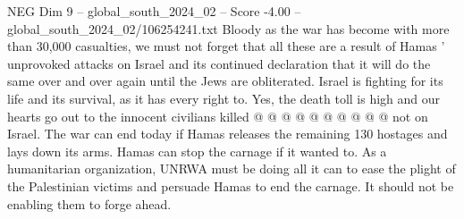 \begin{textsample}{NEG Dim 9 – global\_south\_2024\_02 – Score -4.00 – global\_south\_2024\_02/106254241.txt}
Bloody as the war has become with more than 30,000 casualties, we must not forget that all these are a result of Hamas ' unprovoked attacks on Israel and its continued declaration that it will do the same over and over again until the Jews are obliterated.
Israel is fighting for its life and its survival, as it has every right to.
Yes, the death toll is high and our hearts go out to the innocent civilians killed @ @ @ @ @ @ @ @ @ @ not on Israel.
The war can end today if Hamas releases the remaining 130 hostages and lays down its arms.
Hamas can stop the carnage if it wanted to.
As a humanitarian organization, UNRWA must be doing all it can to ease the plight of the Palestinian victims and persuade Hamas to end the carnage.
It should not be enabling them to forge ahead.

\end{textsample}
